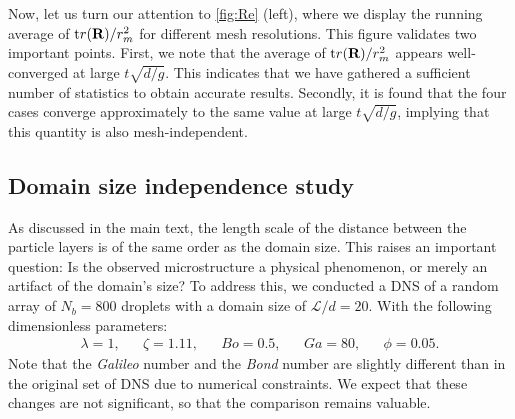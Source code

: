 Now, let us turn our attention to \ref{fig:Re} (left), where we display the running average of $\text tr(\textbf{R})/r_m^2$ for different mesh resolutions.  
This figure validates two important points. 
First, we note that the average of $\text tr(\textbf{R})/r_m^2$ appears well-converged at large $t\sqrt{d/g}$. 
This indicates that we have gathered a sufficient number of statistics to obtain accurate results. 
Secondly, it is found that the four cases converge approximately to the same value at large  $t\sqrt{d/g}$, implying that this quantity is also mesh-independent. 

\subsection{ Domain size independence study}
\label{ap:domain_independence_study}
As discussed in the main text, the length scale of the distance between the particle layers is of the same order as the domain size. 
This raises an important question: Is the observed microstructure a physical phenomenon, or merely an artifact of the domain's size?
To address this, we conducted a DNS of a random array of $N_b=800$ droplets with a domain size of $\mathcal{L}/d = 20$. With the following dimensionless parameters:
\begin{align*}
    \lambda = 1,
    && \zeta = 1.11,
    && Bo = 0.5,
    && Ga = 80,
    && \phi = 0.05. 
\end{align*}
Note that the \textit{Galileo} number and the \textit{Bond} number are slightly different than in the original set of DNS due to numerical constraints.
We expect that these changes are not significant, so that the comparison remains valuable.


